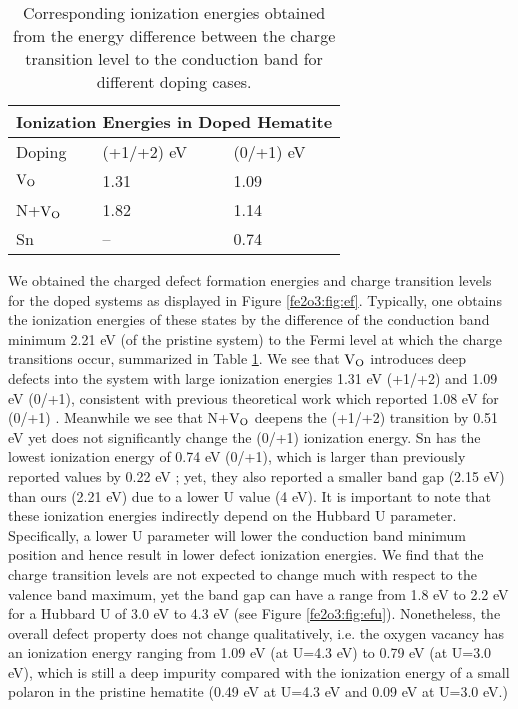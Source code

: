 \begin{table}[t!]
\begin{center}
\begin{tabular}{p{2.5cm}p{2.5cm}p{2.5cm}}
 \hline
 \multicolumn{3}{c}{ Ionization Energies in Doped Hematite \vspace{0.5mm}} \\
 \hline
 Doping & (+1/+2) eV & (0/+1) eV\\
 \hline
 $\text{V}_\text{O}$ & 1.31  & 1.09 \\
 N+$\text{V}_\text{O}$& 1.82 & 1.14 \\
 Sn & -- & 0.74 \\
 \hline
\end{tabular}
\end{center}
\caption{Corresponding ionization energies obtained from the energy difference between the charge transition level to the conduction band for different doping cases.} \label{fe2o3:table:ef}
\end{table}




We obtained the charged defect formation energies and charge transition levels for the doped systems as displayed in Figure \ref{fe2o3:fig:ef}. Typically, one obtains the ionization energies of these states by the difference of the conduction band minimum 2.21 eV (of the pristine system) to the Fermi level at which the charge transitions occur, summarized in Table \ref{fe2o3:table:ef}. We see that $\text{V}_\text{O}$ introduces deep defects into the system with large ionization energies 1.31 eV (+1/+2) and 1.09 eV (0/+1), consistent with previous theoretical work which reported 1.08 eV for (0/+1) \cite{lee2013thermodynamics}. Meanwhile we see that N+$\text{V}_\text{O}$ deepens the (+1/+2) transition by 0.51 eV yet does not significantly change the (0/+1) ionization energy. Sn has the lowest ionization energy of 0.74 eV (0/+1), which is larger than previously reported values by 0.22 eV \cite{zhou2015understanding}; yet, they also reported a smaller band gap (2.15 eV) than ours (2.21 eV) due to a lower U value (4 eV). It is important to note that these ionization energies indirectly depend on the Hubbard U parameter. Specifically, a lower U parameter will lower the conduction band minimum position and hence result in lower defect ionization energies. We find that the charge transition levels are not expected to change much with respect to the valence band maximum, yet the band gap can have a range from 1.8 eV to 2.2 eV for a Hubbard U of 3.0 eV to 4.3 eV (see Figure \ref{fe2o3:fig:efu}). Nonetheless, the overall defect property does not change qualitatively, i.e. the oxygen vacancy has an ionization energy ranging from 1.09 eV (at U=4.3 eV) to 0.79 eV (at U=3.0 eV), which is still a deep impurity compared with the ionization energy of a small polaron in the pristine hematite (0.49 eV at U=4.3 eV and 0.09 eV at U=3.0 eV.)

